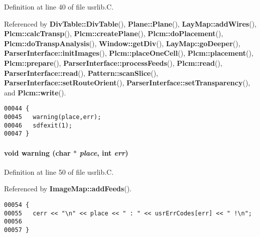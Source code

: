 Definition at line 40 of file usrlib.C.

Referenced by {\bf Div\-Table::Div\-Table}(), {\bf Plane::Plane}(), {\bf Lay\-Map::add\-Wires}(), {\bf Plcm::calc\-Transp}(), {\bf Plcm::create\-Plane}(), {\bf Plcm::do\-Placement}(), {\bf Plcm::do\-Transp\-Analysis}(), {\bf Window::get\-Div}(), {\bf Lay\-Map::go\-Deeper}(), {\bf Parser\-Interface::init\-Images}(), {\bf Plcm::place\-One\-Cell}(), {\bf Plcm::placement}(), {\bf Plcm::prepare}(), {\bf Parser\-Interface::process\-Feeds}(), {\bf Plcm::read}(), {\bf Parser\-Interface::read}(), {\bf Pattern::scan\-Slice}(), {\bf Parser\-Interface::set\-Route\-Orient}(), {\bf Parser\-Interface::set\-Transparency}(), and {\bf Plcm::write}().\small\begin{verbatim}00044 {
00045   warning(place,err);
00046   sdfexit(1);
00047 }
\end{verbatim}\normalsize 
\label{usrlib.h_a13}
\paragraph{\setlength{\rightskip}{0pt plus 5cm}void warning (char $\ast$ {\em place}, int {\em err})}\hfill



Definition at line 50 of file usrlib.C.

Referenced by {\bf Image\-Map::add\-Feeds}().\small\begin{verbatim}00054 {
00055   cerr << "\n" << place << " : " << usrErrCodes[err] << " !\n";
00056 
00057 }
\end{verbatim}\normalsize 
